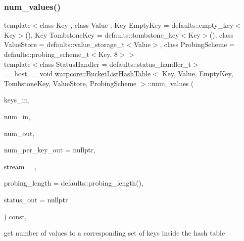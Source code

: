 \subsubsection{\texorpdfstring{num\+\_\+values()}{num\_values()}\hspace{0.1cm}{\footnotesize\ttfamily [2/3]}}
{\footnotesize\ttfamily template$<$class Key , class Value , Key Empty\+Key = defaults\+::empty\+\_\+key$<$\+Key$>$(), Key Tombstone\+Key = defaults\+::tombstone\+\_\+key$<$\+Key$>$(), class Value\+Store  = defaults\+::value\+\_\+storage\+\_\+t$<$\+Value$>$, class Probing\+Scheme  = defaults\+::probing\+\_\+scheme\+\_\+t$<$\+Key, 8$>$$>$ \\
template$<$class Status\+Handler  = defaults\+::status\+\_\+handler\+\_\+t$>$ \\
\+\_\+\+\_\+host\+\_\+\+\_\+ void \hyperlink{classwarpcore_1_1BucketListHashTable}{warpcore\+::\+Bucket\+List\+Hash\+Table}$<$ Key, Value, Empty\+Key, Tombstone\+Key, Value\+Store, Probing\+Scheme $>$\+::num\+\_\+values (\begin{DoxyParamCaption}\item[{const key\+\_\+type $\ast$const}]{keys\+\_\+in,  }\item[{const index\+\_\+type}]{num\+\_\+in,  }\item[{index\+\_\+type \&}]{num\+\_\+out,  }\item[{index\+\_\+type $\ast$const}]{num\+\_\+per\+\_\+key\+\_\+out = {\ttfamily nullptr},  }\item[{const cuda\+Stream\+\_\+t}]{stream = {},  }\item[{const index\+\_\+type}]{probing\+\_\+length = {\ttfamily defaults\+:\+:probing\+\_\+length()},  }\item[{typename Status\+Handler\+::base\+\_\+type $\ast$const}]{status\+\_\+out = {\ttfamily nullptr} }\end{DoxyParamCaption}) const\hspace{0.3cm}{\ttfamily [inline]}, {\ttfamily [noexcept]}}



get number of values to a corresponding set of keys inside the hash table 


